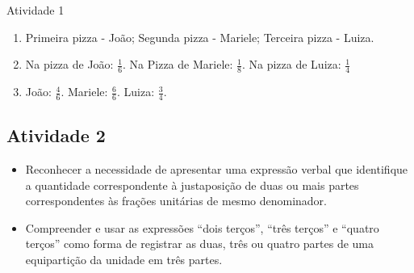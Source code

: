 \begin{multicols}{2}
\begin{resposta*}{Atividade 1}
\begin{enumerate} [\quad a)] %
\item Primeira pizza - João; Segunda pizza - Mariele;  Terceira pizza - Luiza.
\item Na pizza de João: $\frac{1}{6}$. Na Pizza de Mariele: $\frac{1}{8}$. Na pizza de Luiza: $\frac{1}{4}$
\item João: $\frac{4}{6}$.  Mariele: $\frac{6}{6}$. Luiza: $\frac{3}{4}$.
\end{enumerate} %

\end{resposta*}


  
\subsection{Atividade 2}

   \vspace{.1cm}

  \begin{itemize} %
    \item Reconhecer a necessidade de apresentar uma expressão verbal que identifique a quantidade correspondente à justaposição de duas ou mais partes correspondentes às frações unitárias de mesmo denominador.
\item Compreender e usar as expressões ``dois terços'', ``três terços'' e ``quatro terços'' como forma de registrar as duas, três ou quatro partes de uma equipartição da unidade em três partes.
  \end{itemize} %


\end{multicols}
